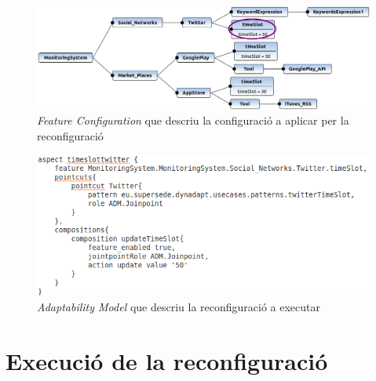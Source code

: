 \begin{figure}
\centering
\includegraphics[width=14cm]{Figures/Figure37}
\decoRule
\caption{\textit{Feature Configuration} que descriu la configuració a aplicar per la reconfiguració}
\label{fig:Figura38}
\end{figure} 

\begin{figure}
\centering
\includegraphics[width=14cm]{Figures/Figure38}
\decoRule
\caption{\textit{Adaptability Model} que descriu la reconfiguració a executar}
\label{fig:Figura39}
\end{figure} 

\section{Execució de la reconfiguració}

